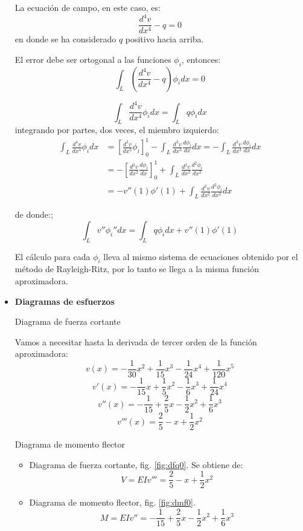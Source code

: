 \begin{example}
\begin{itemize}
	La ecuación de campo, en este caso, es:
	\[ \frac{d^4v}{dx^4} - q = 0 \]
	en donde se ha considerado $q$ positivo hacia arriba.
	
	El error debe ser ortogonal a las funciones $\phi_i$, entonces:
	\[ \int_L \left( \frac{d^4v}{dx^4} - q \right) \phi_i dx = 0\]
	
	\[ \int_L \frac{d^4v}{dx^4} \phi_i dx = \int_L q \phi_i dx  \]
	integrando por partes, dos veces, el miembro izquierdo:
	\[ \begin{split}
		\int_L \frac{d^4v}{dx^4} \phi_i dx &= \left[ \frac{d^3v}{dx^3} \phi_i \right]_0^1 - 
	\int_L \frac{d^3v}{dx^3} \frac{d\phi_i}{dx} dx = - \int_L \frac{d^3v}{dx^3} \frac{d\phi_i}{dx} dx \\
	&= -\left[\frac{d^2v}{dx^2} \frac{d\phi_i}{dx}\right]_0^1 + \int_L \frac{d^2v}{dx^2} 
	\frac{d^2\phi_i}{dx^2}\\
	&= -v''(1) \phi'(1) + \int_L \frac{d^2v}{dx^2} \frac{d^2\phi_i}{dx^2}dx
	\end{split} \]
	
	de donde:;
	\[ \int_L v'' \phi_i'' dx = \int_L q \phi_i dx + v''(1)\phi'(1) \]

	El cálculo para cada $\phi_i$ lleva al mismo sistema de ecuaciones obtenido por el método de Rayleigh-Ritz, por lo tanto se llega a la misma función aproximadora.
	\vspace{2mm}
	\item \textbf{Diagramas de esfuerzos}
	\begin{marginfigure}[-.5cm]
		\centering
		
		\caption{Diagrama de fuerza cortante}
		\label{fig:dfq0}
	\end{marginfigure}
	
	Vamos a necesitar hasta la derivada de tercer orden de la función aproximadora:
	\[ v(x) = -\frac{1}{30}x^2 + \frac{1}{15}x^3 - \frac{1}{24}x^4 + \frac{1}{120}x^5 \]
	\[ v'(x) = -\frac{1}{15}x + \frac{1}{5}x^2 - \frac{1}{6}x^3 + \frac{1}{24}x^4 \]
	\[ v''(x) = -\frac{1}{15} + \frac{2}{5}x - \frac{1}{2}x^2 + \frac{1}{6}x^3 \]
	\[ v'''(x) = \frac{2}{5} - x + \frac{1}{2}x^2 \]
	\begin{marginfigure}[-.5cm]
		\centering
		
		\caption{Diagrama de momento flector}
		\label{fig:dmf0}
	\end{marginfigure}
	
	\begin{itemize}
		\item Diagrama de fuerza cortante, fig. \ref{fig:dfq0}.
		Se obtiene de:
		\[ V = EIv''' = \frac{2}{5} - x + \frac{1}{2}x^2 \]
		\item Diagrama de momento flector, fig. \ref{fig:dmf0}.
		\[ M = EI v'' = -\frac{1}{15} + \frac{2}{5}x - \frac{1}{2}x^2 + \frac{1}{6}x^3 \]
	\end{itemize}
	
\end{itemize}
	
\end{example}
